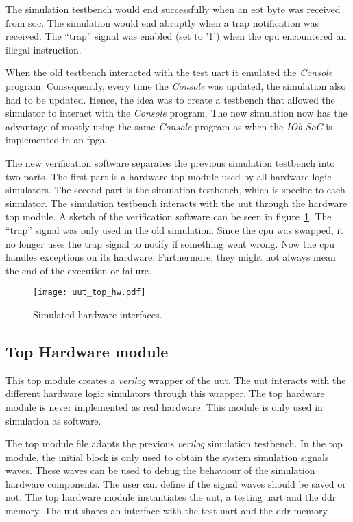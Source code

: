 The simulation testbench would end successfully when an \acrshort{eot} byte was received from \acrshort{soc}. The simulation would end abruptly when a trap notification was received. The \enquote{trap} signal was enabled (set to '1') when the \acrshort{cpu} encountered an illegal instruction.

When the old testbench interacted with the test \acrshort{uart} it emulated the \textit{Console} program. Consequently, every time the \textit{Console} was updated, the simulation also had to be updated. Hence, the idea was to create a testbench that allowed the simulator to interact with the \textit{Console} program. The new simulation now has the advantage of mostly using the same \textit{Console} program as when the \textit{IOb-SoC} is implemented in an \acrshort{fpga}.

The new verification software separates the previous simulation testbench into two parts. The first part is a hardware top module used by all hardware logic simulators. The second part is the simulation testbench, which is specific to each simulator. The simulation testbench interacts with the \acrshort{uut} through the hardware top module. A sketch of the verification software can be seen in figure~\ref{fig:uut_top_hw}. The \enquote{trap} signal was only used in the old simulation. Since the \acrshort{cpu} was swapped, it no longer uses the trap signal to notify if something went wrong. Now the \acrshort{cpu} handles exceptions on its hardware. Furthermore, they might not always mean the end of the execution or failure.

\begin{figure}[!ht]
    \centering
    \texttt{[image: uut\_top\_hw.pdf]}
    \caption{Simulated hardware interfaces.}
    \label{fig:uut_top_hw}
\end{figure}

\subsection{Top Hardware module}
This top module creates a \textit{verilog} wrapper of the \acrfull{uut}. The \acrshort{uut} interacts with the different hardware logic simulators through this wrapper. The top hardware module is never implemented as real hardware. This module is only used in simulation as software.

The top module file adapts the previous \textit{verilog} simulation testbench. In the top module, the initial block is only used to obtain the system simulation signals waves. These waves can be used to debug the behaviour of the simulation hardware components. The user can define if the signal waves should be saved or not. The top hardware module instantiates the \acrfull{uut}, a testing \acrshort{uart} and the \acrshort{ddr} memory. The \acrshort{uut} shares an interface with the test \acrshort{uart} and the \acrshort{ddr} memory.

